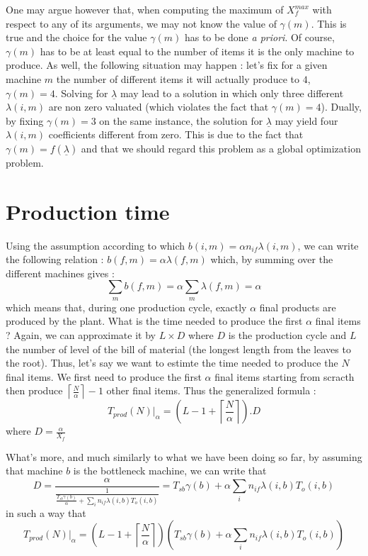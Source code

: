One may argue however that, when computing the maximum of $X_f^{max}$ with respect to any of its arguments, we may not know the value of $\gamma(m)$. This is true and the choice for the value $\gamma(m)$ has to be done \textit{a priori}. Of course, $\gamma(m)$ has to be at least equal to the number of items it is the only machine to produce. As well, the following situation may happen : let's fix for a given machine $m$ the number of different items it will actually produce to $4$, $\gamma(m) = 4$. Solving for $\underline \lambda$ may lead to a solution in which only three different $\lambda(i,m)$ are non zero valuated (which violates the fact that $\gamma(m) = 4$). Dually, by fixing $\gamma(m) = 3$ on the same instance, the solution for $\underline \lambda$ may yield four $\lambda(i,m)$ coefficients different from zero. This is due to the fact that $\gamma(m) = f(\underline \lambda)$ and that we should regard this problem as a global optimization problem. 

\section{Production time}

Using the assumption according to which $b(i,m) = \alpha n_{if}\lambda(i,m)$, we can write the following relation : $b(f,m) = \alpha\lambda(f,m)$ which, by summing over the different machines gives : 
\[ \sum_mb(f,m) = \alpha\sum_m\lambda(f,m)=\alpha \]
which means that, during one production cycle, exactly $\alpha$ final products are produced by the plant. What is the time needed to produce the first $\alpha$ final items ? Again, we can approximate it by $L\times D$ where $D$ is the production cycle and $L$ the number of level of the bill of material (the longest length from the leaves to the root). Thus, let's say we want to estimte the time needed to produce the $N$ final items. We first need to produce the first $\alpha$ final items starting from scracth then produce $\left\lceil\frac{N}{\alpha}\right\rceil - 1$ other final items. Thus the generalized formula :
\[
    T_{prod}(N)|_\alpha = \left(L-1 + \left\lceil \frac{N}{\alpha} \right\rceil \right).D
\] where $D = \frac{\alpha}{X_f}$

What's more, and much similarly to what we have been doing so far, by assuming that machine $b$ is the bottleneck machine, we can write that 
\[
    D = \dfrac{ \alpha }{
        \frac{1}{
            \frac{T_{sb}\gamma(b)}{\alpha}
            + \sum_i n_{if}\lambda(i,b)T_o(i,b)
        }
    } = T_{sb}\gamma(b) + \alpha\sum_i n_{if}\lambda(i,b)T_o(i,b)
\] in such a way that 
\[
    T_{prod}(N)|_\alpha = \left(L-1 + \left\lceil \frac{N}{\alpha} \right\rceil \right)\left( T_{sb}\gamma(b) + \alpha\sum_i n_{if}\lambda(i,b)T_o(i,b) \right)
\]

